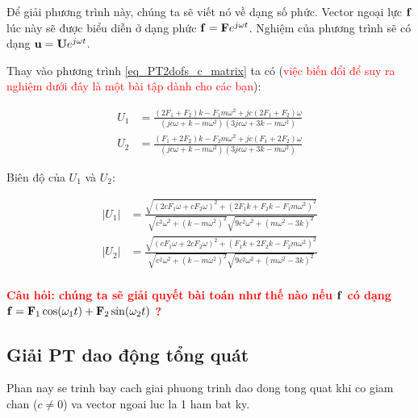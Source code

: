 Để giải phương trình này, chúng ta sẽ viết nó về dạng số phức. Vector ngoại lực ${\bf f}$ lúc này sẽ được biểu diễn ở dạng phức ${\bf f} = {\bf F}e^{j\omega t}$. Nghiệm của phương trình sẽ có dạng ${\bf u} = {\bf U}e^{j\omega t}$.

Thay vào phương trình \cref{eq_PT2dofs_c_matrix} ta có (\textcolor{red}{việc biến đổi để suy ra nghiệm dưới đây là một bài tập dành cho các bạn}):

\begin{equation}\label{eq_nghiemphuc}
    \begin{aligned}
        {U}_1 &=\frac{\left(2 F_1+F_2\right) k-F_1 m \omega^2+j c\left(2 F_1+F_2\right) \omega}{\left(j c \omega+k-m \omega^2\right)\left(3 j c \omega+3 k-m \omega^2\right)}\\
        {U}_2 &=\frac{\left(F_1+2 F_2\right) k-F_2 m \omega^2+j c\left(F_1+2 F_2\right) \omega}{\left(j c \omega+k-m \omega^2\right)\left(3 j c \omega+3 k-m \omega^2\right)}
    \end{aligned}
\end{equation}

Biên độ của $U_1$ và $U_2$:

\begin{equation}
    \begin{aligned}
         \left|U_1\right|&=\frac{\sqrt{\left(2 c F_1 \omega+c F_2 \omega\right)^2+\left(2 F_1 k+F_2 k-F_1 m \omega^2\right)^2}}{\sqrt{c^2 \omega^2+\left(k-m \omega^2\right)^2} \sqrt{9 c^2 \omega^2+\left(m \omega^2-3 k\right)^2}} \\
         \left|U_2\right|&=\frac{\sqrt{\left(c F_1 \omega+2 c F_2 \omega\right)^2+\left(F_1 k+2 F_2 k-F_2 m \omega^2\right)^2}}{\sqrt{c^2 \omega^2+\left(k-m \omega^2\right)^2} \sqrt{9 c^2 \omega^2+\left(m \omega^2-3 k\right)^2}}\\
    \end{aligned}
\end{equation}

\textbf{\textcolor{red}{Câu hỏi: chúng ta sẽ giải quyết bài toán như thế nào nếu ${\bf f}$ có dạng ${\bf f} = {\bf F}_1\cos(\omega_1t) + {\bf F}_2\sin(\omega_2t)$ ?}}

\subsection{Giải PT dao động tổng quát}

Phan nay se trinh bay cach giai phuong trinh dao dong tong quat khi co giam chan ($c \neq 0$) va vector ngoai luc la 1 ham bat ky. 

